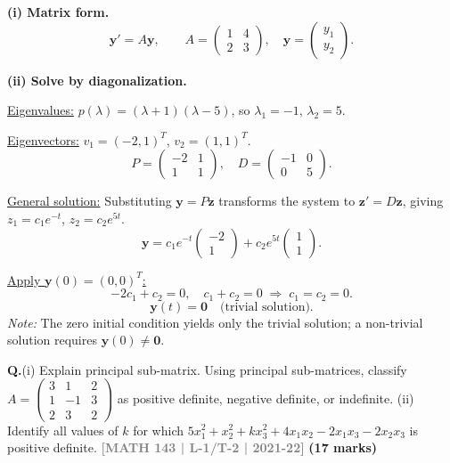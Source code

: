 \documentclass[12pt,a3paper]{article}
\newcommand{\yr}[1]{\hfill\textcolor{gray}{\small\textbf{[#1]}}}
\newcommand{\mk}[1]{\textcolor{orange!70!black}{\small\textbf{(#1 marks)}}}
\newcounter{qnum}
\newcommand{\Q}[1]{%
  \needspace{4\baselineskip}
  \refstepcounter{qnum}
  \vspace{6pt}
  \noindent\textbf{Q\theqnum.}\enspace #1\par
}
\begin{document}
\begin{tcolorbox}[enhanced,breakable,
  colback=cE!4,colframe=cE,boxrule=0.8pt,arc=5pt,
  title={\textbf{Answer --- ODE System via Diagonalization}},
  fonttitle=\bfseries\color{white},colbacktitle=cE]

\textbf{(i) Matrix form.}
\[
\mathbf{y}'=A\mathbf{y},\qquad A=\begin{pmatrix}1&4\\2&3\end{pmatrix},\quad\mathbf{y}=\begin{pmatrix}y_1\\y_2\end{pmatrix}.
\]

\textbf{(ii) Solve by diagonalization.}

\underline{Eigenvalues:} $p(\lambda)=(\lambda+1)(\lambda-5)$, so $\lambda_1=-1$, $\lambda_2=5$.

\underline{Eigenvectors:} $v_1=(-2,1)^T$, $v_2=(1,1)^T$.
\[
P=\begin{pmatrix}-2&1\\1&1\end{pmatrix},\quad D=\begin{pmatrix}-1&0\\0&5\end{pmatrix}.
\]

\underline{General solution:} Substituting $\mathbf{y}=P\mathbf{z}$ transforms the system to $\mathbf{z}'=D\mathbf{z}$, giving $z_1=c_1e^{-t}$, $z_2=c_2e^{5t}$.
\[
\mathbf{y}=c_1e^{-t}\begin{pmatrix}-2\\1\end{pmatrix}+c_2e^{5t}\begin{pmatrix}1\\1\end{pmatrix}.
\]

\underline{Apply $\mathbf{y}(0)=(0,0)^T$:}
\[
-2c_1+c_2=0,\quad c_1+c_2=0\;\Rightarrow\;c_1=c_2=0.
\]
\[
\boxed{\mathbf{y}(t)=\mathbf{0}\quad\text{(trivial solution).}}
\]
\textit{Note:} The zero initial condition yields only the trivial solution; a non-trivial solution requires $\mathbf{y}(0)\neq\mathbf{0}$.

\end{tcolorbox}

\Q{(i) Explain principal sub-matrix. Using principal sub-matrices, classify $A = \begin{pmatrix} 3 & 1 & 2 \\ 1 & -1 & 3 \\ 2 & 3 & 2 \end{pmatrix}$ as positive definite, negative definite, or indefinite. (ii) Identify all values of $k$ for which $5x_1^2 + x_2^2 + kx_3^2 + 4x_1x_2 - 2x_1x_3 - 2x_2x_3$ is positive definite.
\yr{MATH 143 | L-1/T-2 | 2021-22} \mk{17}}
\end{document}
